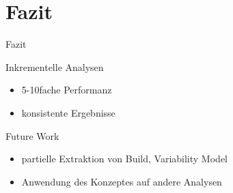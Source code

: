 \documentclass[aspectratio=43, noserifmath]{beamer}
\begin{document}
\section{Fazit}
\begin{frame}{Fazit}

Inkrementelle Analysen
 
\begin{itemize}
    \item[\textbullet] 5-10fache Performanz
    \item[\textbullet]  konsistente Ergebnisse
\end{itemize}
Future Work
\begin{itemize}
    \item[\textbullet]  partielle Extraktion von Build, Variability Model
    \item[\textbullet]  Anwendung des Konzeptes auf andere Analysen
\end{itemize}
\end{frame}
\end{document}
